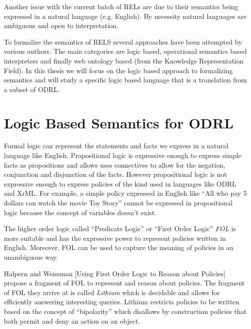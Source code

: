 Another issue with the current batch of RELs are due to their semantics being expressed in a natural language (e.g. English). By necessity natural languages are ambiguous and open to interpretation. 

To formalize the semantics of RELS several approaches have been attempted by various authors. The main categories are logic based, operational semantics based interpreters and finally web ontology based (from the Knowledge Representation Field). In this thesis we will focus on the logic based approach to formalizing semantics and will study a specific logic based language that is a translation from a subset of ODRL.









\section{Logic Based Semantics for ODRL}


Formal logic can represent the statements and facts we express in a natural language like English. Propositional logic is expressive enough to express simple facts as propositions and allows uses connectives to allow for the negation, conjunction and disjunction of the facts. However propositional logic is not expressive enough to express policies of the kind used in languages like ODRL and XrML. For example, a simple policy expressed in English like ``All who pay 5 dollars can watch the movie Toy Story'' cannot be expressed in propositional logic because the concept of  variables doesn't exist. 

The higher order logic called ``Predicate Logic'' or ``First Order Logic'' \emph{FOL} is more suitable and has the expressive power to represent policies written in English. Moreover, FOL can be used to capture the meaning of policies in an unambiguous way.

Halpern and Weissman [Using First Order Logic to Reason about Policies] propose a fragment of FOL to represent and reason about policies. The fragment of FOL they arrive at is called \emph{Lithium} which is decidable and allows for efficiently answering interesting queries. Lithium restricts policies to be written based on the concept of ``bipolarity'' which disallows by construction policies that both permit and deny an action on an object.


